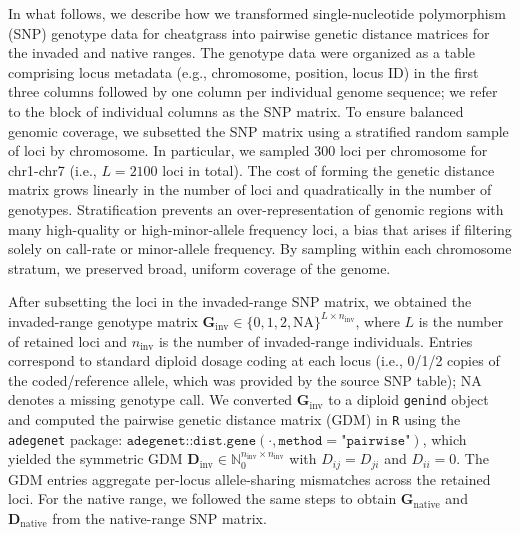 \documentclass{article}
\begin{document}
In what follows, we describe how we transformed single-nucleotide polymorphism (SNP) genotype data for cheatgrass into pairwise genetic distance matrices for the invaded and native ranges. 
The genotype data were organized as a table comprising locus metadata (e.g., chromosome, position, locus ID) in the first three columns followed by one column per individual genome sequence; we refer to the block of individual columns as the SNP matrix.
To ensure balanced genomic coverage, we subsetted the SNP matrix using a stratified random sample of loci by chromosome. In particular, we sampled 300 loci per chromosome for chr1-chr7 (i.e., $L=2100$ loci in total). 
The cost of forming the genetic distance matrix grows linearly in the number of loci and quadratically in the number of genotypes.
Stratification prevents an over-representation of genomic regions with many high-quality or high-minor-allele frequency loci, a bias that arises if filtering solely on call-rate or minor-allele frequency. 
By sampling within each chromosome stratum, we preserved broad, uniform coverage of the genome. 

After subsetting the loci in the invaded-range SNP matrix, we obtained the invaded-range genotype matrix $\mathbf{G}_{\text{inv}}\in\{0,1,2,\text{NA}\}^{L\times n_\text{inv}}$, where $L$ is the number of retained loci and $n_{\text{inv}}$ is the number of invaded-range individuals. 
Entries correspond to standard diploid dosage coding at each locus (i.e., 0/1/2 copies of the coded/reference allele, which was provided by the source SNP table); NA denotes a missing genotype call. We converted $\mathbf{G}_{\text{inv}}$ to a diploid \texttt{genind} object and computed the pairwise genetic distance matrix (GDM) in \texttt{R} using the \texttt{adegenet} package: $\texttt{adegenet::dist.gene}(\cdot, \texttt{method}=\texttt{"pairwise"})$, which yielded the symmetric GDM $\mathbf{D}_{\text{inv}}\in\mathbb{N}_0^{n_{\text{inv}}\times n_{\text{inv}}}$ with $D_{ij}=D_{ji}$ and $D_{ii}=0$. The GDM entries aggregate per-locus allele-sharing mismatches across the retained loci. For the native range, we followed the same steps to obtain $\mathbf{G}_{\text{native}}$ and $\mathbf{D}_{\text{native}}$ from the native-range SNP matrix. 
\end{document}

